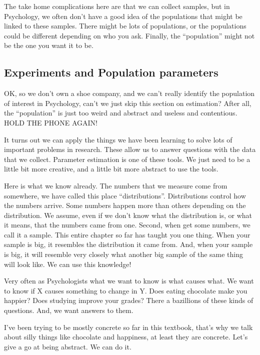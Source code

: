\documentclass[
  letterpaper,
  DIV=11,
  numbers=noendperiod]{scrreprt}
\begin{document}
The take home complications here are that we can collect samples, but in
Psychology, we often don't have a good idea of the populations that
might be linked to these samples. There might be lots of populations, or
the populations could be different depending on who you ask. Finally,
the ``population'' might not be the one you want it to be.

\subsection{Experiments and Population
parameters}\label{experiments-and-population-parameters}

OK, so we don't own a shoe company, and we can't really identify the
population of interest in Psychology, can't we just skip this section on
estimation? After all, the ``population'' is just too weird and abstract
and useless and contentious. HOLD THE PHONE AGAIN!

It turns out we can apply the things we have been learning to solve lots
of important problems in research. These allow us to answer questions
with the data that we collect. Parameter estimation is one of these
tools. We just need to be a little bit more creative, and a little bit
more abstract to use the tools.

Here is what we know already. The numbers that we measure come from
somewhere, we have called this place ``distributions''. Distributions
control how the numbers arrive. Some numbers happen more than others
depending on the distribution. We assume, even if we don't know what the
distribution is, or what it means, that the numbers came from one.
Second, when get some numbers, we call it a sample. This entire chapter
so far has taught you one thing. When your sample is big, it resembles
the distribution it came from. And, when your sample is big, it will
resemble very closely what another big sample of the same thing will
look like. We can use this knowledge!

Very often as Psychologists what we want to know is what causes what. We
want to know if X causes something to change in Y. Does eating chocolate
make you happier? Does studying improve your grades? There a bazillions
of these kinds of questions. And, we want answers to them.

I've been trying to be mostly concrete so far in this textbook, that's
why we talk about silly things like chocolate and happiness, at least
they are concrete. Let's give a go at being abstract. We can do it.
\end{document}
